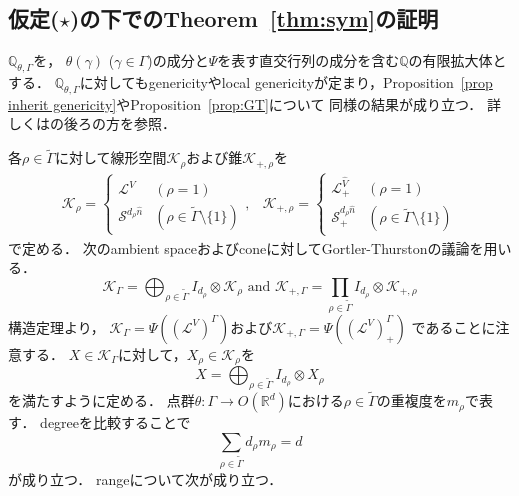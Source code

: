 \documentclass[11pt]{article}
\theoremstyle{definition}
\begin{document}
\subsection{仮定($\star$)の下でのTheorem~\ref{thm:sym}の証明} \label{sec:4.4}
    $\mathbb{Q}_{\theta,\Gamma}$を，
    $\theta(\gamma)$ ($\gamma \in \Gamma$)の成分と$\Psi$を表す直交行列の成分を含む$\mathbb{Q}$の有限拡大体とする．
    $\mathbb{Q}_{\theta,\Gamma}$に対してもgenericityやlocal genericityが定まり，Proposition~\ref{prop inherit genericity}やProposition~\ref{prop:GT}について
    同様の結果が成り立つ．
    詳しくは\cite{GT}の後ろの方を参照．
    
    各$\rho \in \tilde{\Gamma}$に対して線形空間$\mathcal{K}_\rho$および錐$\mathcal{K}_{+,\rho}$を
    \[
    \begin{array}{ll}
        \mathcal{K}_\rho = 
        \begin{cases}
            \mathcal{L}^{\hat{V}} & (\rho = 1) \\
            \mathcal{S}^{d_\rho \hat{n}} & (\rho \in \tilde{\Gamma} \setminus \{1\})
        \end{cases},
        &
        \mathcal{K}_{+,\rho} = 
        \begin{cases}
            \mathcal{L}^{\hat{V}}_+ & (\rho = 1) \\
            \mathcal{S}^{d_\rho \hat{n}}_+ & (\rho \in \tilde{\Gamma} \setminus \{1\})
        \end{cases}
    \end{array}
    \]
    で定める．
    次のambient spaceおよびconeに対してGortler-Thurstonの議論を用いる．
    \[
        \mathcal{K}_\Gamma=  \bigoplus_{\rho \in \tilde{\Gamma}} I_{d_\rho} \otimes  \mathcal{K}_\rho 
        \text{ and }
        \mathcal{K}_{+,\Gamma} =  \prod_{\rho \in \tilde{\Gamma}} I_{d_\rho} \otimes  \mathcal{K}_{+,\rho}
    \]
    構造定理より，
    $\mathcal{K}_\Gamma= \Psi((\mathcal{L}^V)^\Gamma)$および$\mathcal{K}_{+,\Gamma} = \Psi((\mathcal{L}^V)^\Gamma_+)$
    であることに注意する．
    $X \in \mathcal{K}_\Gamma$に対して，$X_\rho \in \mathcal{K}_\rho$を
    \[
        X= \bigoplus_{\rho \in \tilde{\Gamma}} I_{d_\rho} \otimes X_\rho
    \] 
    を満たすように定める．
    点群$\theta:\Gamma \rightarrow O(\mathbb{R}^d)$における$\rho \in \tilde{\Gamma}$の重複度を$m_\rho$で表す．
    degreeを比較することで
    \begin{equation} \label{eq:a}
        \sum_{\rho \in \tilde{\Gamma}} d_\rho m_\rho=d
    \end{equation}
    が成り立つ．
    rangeについて次が成り立つ．
\end{document}
